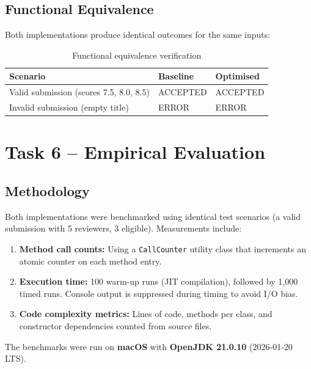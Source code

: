 \documentclass[12pt, a4paper]{article}
\begin{document}
\subsection{Functional Equivalence}

Both implementations produce identical outcomes for the same inputs:

\begin{table}[H]
\centering
\caption{Functional equivalence verification}
\label{tab:equivalence}
\begin{tabular}{l l l}
    \toprule
    \textbf{Scenario} & \textbf{Baseline} & \textbf{Optimised} \\
    \midrule
    Valid submission (scores 7.5, 8.0, 8.5) & ACCEPTED & ACCEPTED \\
    Invalid submission (empty title) & ERROR & ERROR \\
    \bottomrule
\end{tabular}
\end{table}

\section{Task 6 -- Empirical Evaluation}
\label{sec:task6}

\subsection{Methodology}

Both implementations were benchmarked using identical test scenarios (a valid submission with 5 reviewers, 3 eligible). Measurements include:

\begin{enumerate}[nosep]
    \item \textbf{Method call counts:} Using a \texttt{CallCounter} utility class that increments an atomic counter on each method entry.
    \item \textbf{Execution time:} 100 warm-up runs (JIT compilation), followed by 1{,}000 timed runs. Console output is suppressed during timing to avoid I/O bias.
    \item \textbf{Code complexity metrics:} Lines of code, methods per class, and constructor dependencies counted from source files.
\end{enumerate}

The benchmarks were run on \textbf{macOS} with \textbf{OpenJDK 21.0.10} (2026-01-20 LTS).
\end{document}
